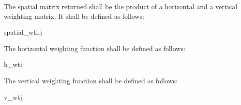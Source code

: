 The spatial matrix returned shall be the product of a horizontal and a vertical
weighting matrix. It shall be defined as follows:

\begin{pseudo}{spatial\_wt}{i,j}
    \bsEND
\bsEND
{}
\end{pseudo}

The horizontal weighting function shall be defined as follows:

\begin{pseudo}{h\_wt}{i}
    \bsEND
\bsELSE
\bsEND
{}
\bsEND
{}
    \bsEND
{}
    \bsEND
\bsEND
{}
\end{pseudo}

The vertical weighting function  shall be defined as follows:

\begin{pseudo}{v\_wt}{j}
    \bsEND
\bsELSE
\bsEND
{}
\bsEND
{}
    \bsEND
{}
    \bsEND
\bsEND
{}
\end{pseudo}

